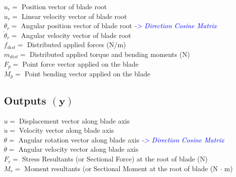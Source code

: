 \documentclass[11pt]{article}
\newcommand{\comm}[1]{\textcolor{blue}{\textit{#1}}}
\begin{document}
$u_r = $ Position vector of blade root \\
$\dot{u}_r = $ Linear velocity vector of blade root \\
$\theta_r = $ Angular position vector of blade root 
\comm{-> Direction Cosine Matrix}\\
$\dot{\theta}_r = $ Angular velocity vector of blade root\\
$f_{dist} = $ Distributed applied forces (N/m) \\
$m_{dist} = $ Distributed applied torque and bending moments (N) \\
$F_p = $ Point force vector applied on the blade \\
$M_p = $ Point bending vector applied on the blade

\subsection*{Outputs $(\textbf{y})$}

$u = $ Displacement vector along blade axis \\
$\dot{u} = $ Velocity vector along blade axis \\
$\theta = $ Angular rotation vector along blade axis 
\comm{-> Direction Cosine Matrix}\\
$\dot{\theta} = $ Angular velocity vector along blade axis \\
$F_r = $ Stress Resultants (or Sectional Force) at the root of blade (N) \\
$M_r = $ Moment resultants (or Sectional Moment at the root of blade (N $\cdot$ m) 


\end{document}

